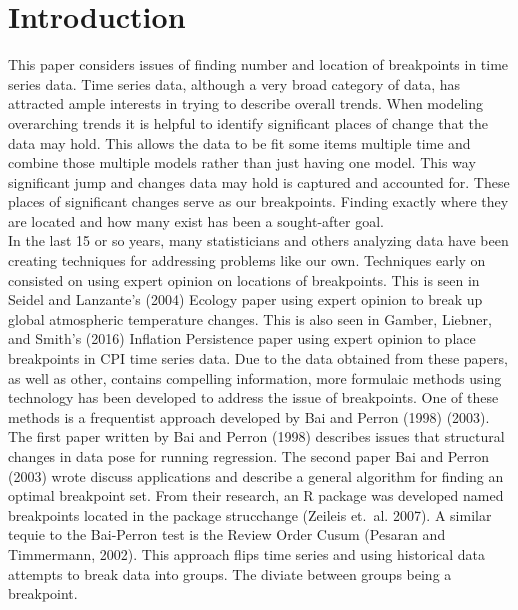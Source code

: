 \documentclass[submit]{smj}
\begin{document}
\maketitle


\section{Introduction}
This paper considers issues of finding number and location of breakpoints in time series data. Time series data, although a very broad category of data, has attracted ample interests in trying to describe overall trends. When modeling overarching trends it is helpful to identify significant places of change that the data may hold. This allows the data to be fit some items multiple time and combine those multiple models rather than just having one model.  This way significant jump and changes data may hold is captured and accounted for. These places of significant changes serve as our breakpoints.  Finding exactly where they are located and how many exist has been a sought-after goal. \\
    In the last 15 or so years, many statisticians and others analyzing data have been creating techniques for addressing problems like our own. Techniques early on consisted on using expert opinion on locations of breakpoints. This is seen in Seidel and Lanzante’s (2004) Ecology paper using expert opinion to break up global atmospheric temperature changes.  This is also seen in Gamber, Liebner, and Smith's (2016) Inflation Persistence paper using expert opinion to place breakpoints in CPI time series data.  Due to the data obtained from these papers, as well as other, contains compelling information, more formulaic methods using technology has been developed to address the issue of breakpoints. One of these methods is a frequentist approach developed by Bai and Perron (1998) (2003). The first paper written by Bai and Perron (1998) describes issues that structural changes in data pose for running regression. The second paper Bai and Perron (2003) wrote discuss applications and describe a general algorithm for finding an optimal breakpoint set. From their research, an R package was developed named breakpoints located in the package strucchange (Zeileis et.~al. 2007).  A similar tequie to the Bai-Perron test is the Review Order Cusum (Pesaran and Timmermann, 2002). This approach flips time series and using historical data attempts to break data into groups. The diviate between groups being a breakpoint. 
\end{document}
